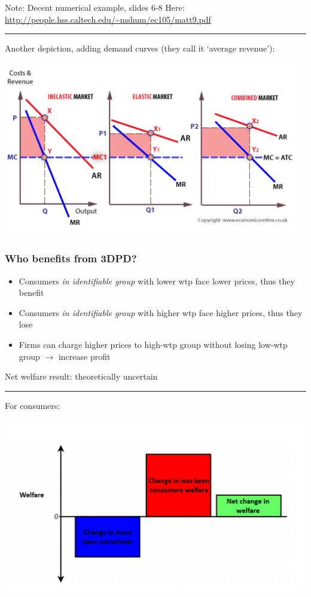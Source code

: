 \documentclass[]{article}
\providecommand{\tightlist}{%
  \setlength{\itemsep}{0pt}\setlength{\parskip}{0pt}}
\begin{document}
Note: Decent numerical example, slides 6-8 Here: \url{http://people.hss.caltech.edu/~mshum/ec105/matt9.pdf}

\begin{center}\rule{0.5\linewidth}{\linethickness}\end{center}

Another depiction, adding demand curves (they call it `average revenue'):

\includegraphics[height=3in]{picsfigs/Price-discrimination-SNP2.png}

\hypertarget{who-benefits-from-3dpd}{%
\subsubsection{Who benefits from 3DPD?}\label{who-benefits-from-3dpd}}

\begin{itemize}
\tightlist
\item
  Consumers \emph{in identifiable group} with lower wtp face lower prices, thus they benefit
\item
  Consumers \emph{in identifiable group} with higher wtp face higher prices, thus they lose
\item
  Firms can charge higher prices to high-wtp group without losing low-wtp group \(\rightarrow\) increase profit
\end{itemize}

\bigskip

Net welfare result: theoretically uncertain

\begin{center}\rule{0.5\linewidth}{\linethickness}\end{center}

For consumers:

\includegraphics[height=3in]{picsfigs/pdwelfare.png}
\end{document}
